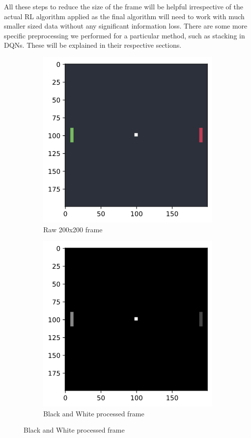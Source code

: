 \medskip
\noindent
All these steps to reduce the size of the frame will be helpful irrespective of the actual RL algorithm applied as the final algorithm will need to work with much smaller sized data without any significant information loss. There are some more specific preprocessing we performed for a particular method, such as stacking in DQNs. These will be explained in their respective sections.
\begin{figure}[htb!]
    \centering
    \begin{subfigure}{.49\textwidth}
        \centering
        \includegraphics[scale=0.53]{figures/raw.png}
        \caption{Raw 200x200 frame}
        \label{fig-raw}
    \end{subfigure}
    \begin{subfigure}{0.49\textwidth}
        \centering
        \includegraphics[scale=0.53]{figures/bw.png}
        \caption{Black and White processed frame}
        \label{fig-bw}
    \end{subfigure}


\end{figure}
